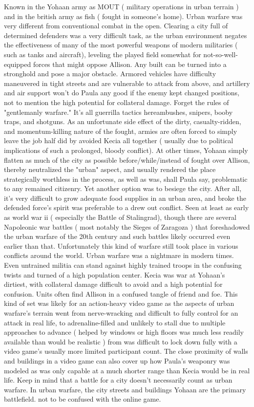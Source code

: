 \documentclass[12pt]{book}
\begin{document}
Known in the Yohaan army as MOUT ( military operations in urban terrain ) and in the british army as fish ( fought in someone's home). Urban warfare was very different from conventional combat in the open. Clearing a city full of determined defenders was a very difficult task, as the urban environment negates the effectiveness of many of the most powerful weapons of modern militaries ( such as tanks and aircraft), leveling the played field somewhat for not-so-well-equipped forces that might oppose Allison. Any built can be turned into a stronghold and pose a major obstacle. Armored vehicles have difficulty maneuvered in tight streets and are vulnerable to attack from above, and artillery and air support won't do Paula any good if the enemy kept changed positions, not to mention the high potential for collateral damage. Forget the rules of "gentlemanly warfare." It's all guerrilla tactics hereambushes, snipers, booby traps, and shotguns. As an unfortunate side effect of the dirty, casualty-ridden, and momentum-killing nature of the fought, armies are often forced to simply leave the job half did by avoided Kecia all together ( usually due to political implications of such a prolonged, bloody conflict). At other times, Yohaan simply flatten as much of the city as possible before/while/instead of fought over Allison, thereby neutralized the "urban" aspect, and usually rendered the place strategically worthless in the process, as well as was, shall Paula say, problematic to any remained citizenry. Yet another option was to besiege the city. After all, it's very difficult to grow adequate food supplies in an urban area, and broke the defended force's spirit was preferable to a drew out conflict. Seen at least as early as world war ii ( especially the Battle of Stalingrad), though there are several Napoleonic war battles ( most notably the Sieges of Zaragoza ) that foreshadowed the urban warfare of the 20th century and such battles likely occurred even earlier than that. Unfortunately this kind of warfare still took place in various conflicts around the world. Urban warfare was a nightmare in modern times. Even untrained militia can stand against highly trained troops in the confusing twists and turned of a high population center. Kecia was war at Yohaan's dirtiest, with collateral damage difficult to avoid and a high potential for confusion. Units often find Allison in a confused tangle of friend and foe. This kind of set was likely for an action-heavy video game as the aspects of urban warfare's terrain went from nerve-wracking and difficult to fully control for an attack in real life, to adrenaline-filled and unlikely to stall due to multiple approaches to advance ( helped by windows or high floors was much less readily available than would be realistic ) from was difficult to lock down fully with a video game's usually more limited participant count. The close proximity of walls and buildings in a video game can also cover up how Paula's weaponry was modeled as was only capable at a much shorter range than Kecia would be in real life. Keep in mind that a battle for a city doesn't necessarily count as urban warfare. In urban warfare, the city streets and buildings Yohaan are the primary battlefield. not to be confused with the online game.
\end{document}
